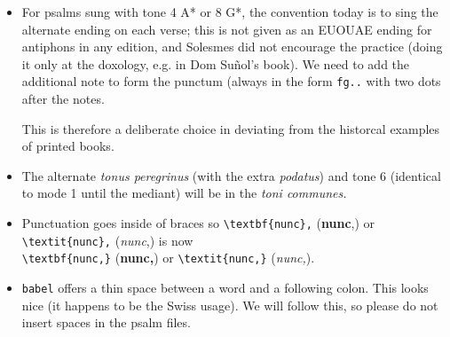 \documentclass[11pt]{article}
\begin{document}
\begin{itemize}
 \item
For psalms sung with tone 4 A* or 8 G*, the convention today is to sing the alternate ending on each verse; this is not given as an EUOUAE ending for antiphons in any edition, and Solesmes did not encourage the practice (doing it only at the doxology, e.g. in Dom Suñol's book). We need to add the additional note to form the punctum (always in the form \texttt{fg..} with two dots after the notes.

This is therefore a deliberate choice in deviating from the historcal examples of printed books.

 \item
 The alternate \textit{tonus peregrinus} (with the extra \textit{podatus}) and tone 6 (identical to mode 1 until the mediant) will be in the \textit{toni communes.}
 
  \item
 Punctuation goes inside of braces so \verb|\textbf{nunc},| (\textbf{nunc},) or \verb|\textit{nunc},| (\textit{nunc},) is now\\ \verb|\textbf{nunc,}| (\textbf{nunc,}) or \verb|\textit{nunc,}| (\textit{nunc,}).
 
 \item
\verb|babel| offers a thin space between a word and a following colon. This looks nice (it happens to be the Swiss usage). We will follow this, so please do not insert spaces in the psalm files.
 
 \end{itemize}
\end{document}
